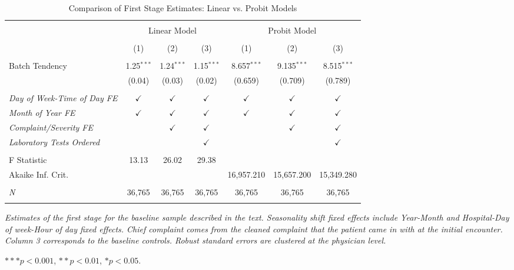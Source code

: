 \documentclass[,,nonblindrev]{informs}
\begin{document}
\begin{table}[!htbp] \centering 
  \caption{Comparison of First Stage Estimates: Linear vs. Probit Models}
  \label{table:first_stage}
\begin{tabular}{@{\extracolsep{5pt}}lcccccc} 
\\[-1.8ex]\hline 
\hline \\[-1.8ex] 
 & \multicolumn{3}{c}{Linear Model} & \multicolumn{3}{c}{Probit Model} \\ 
\cline{2-4} \cline{5-7}
\\[-1.8ex] & (1) & (2) & (3) & (1) & (2) & (3)\\ 
\hline \\[-1.8ex] 
 Batch Tendency & 1.25$^{***}$ & 1.24$^{***}$ & 1.15$^{***}$ & 8.657$^{***}$ & 9.135$^{***}$ & 8.515$^{***}$ \\ 
  & (0.04) & (0.03) & (0.02) & (0.659) & (0.709) & (0.789) \\ 
  & & & & & & \\
\textit{Day of Week-Time of Day FE} & $\checkmark$ & $\checkmark$ & $\checkmark$ & $\checkmark$ & $\checkmark$ & $\checkmark$ \\
\textit{Month of Year FE} & $\checkmark$ & $\checkmark$ & $\checkmark$ & $\checkmark$ & $\checkmark$ & $\checkmark$ \\
\textit{Complaint/Severity FE} & & $\checkmark$ & $\checkmark$ & & $\checkmark$ & $\checkmark$ \\
\textit{Laboratory Tests Ordered} & & & $\checkmark$ & & & $\checkmark$ \\
\hline 
\hline \\[-1.8ex] 
F Statistic & 13.13 & 26.02 & 29.38 &  &  &  \\
Akaike Inf. Crit. & & & & 16,957.210 & 15,657.200 & 15,349.280 \\ 
\\
\textit{N} & 36,765 & 36,765 & 36,765 & 36,765 & 36,765 & 36,765 \\ 

\hline \\[-1.8ex] 
\end{tabular} 
\begin{tablenotes}
\small
\item \textit{Estimates of the first stage for the baseline sample described in the text. Seasonality shift fixed effects include Year-Month and Hospital-Day of week-Hour of day fixed effects. Chief complaint comes from the cleaned complaint that the patient came in with at the initial encounter. Column 3 corresponds to the baseline controls. Robust standard errors are clustered at the physician level.}
\item $*** p < 0.001$, $** p < 0.01$, $* p < 0.05$.
\end{tablenotes}
\end{table}
\end{document}
